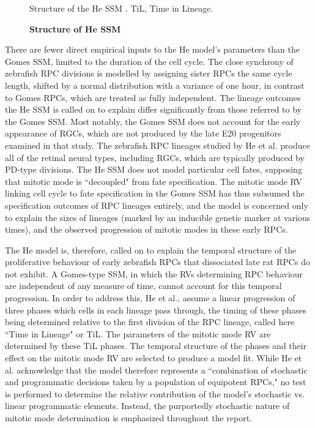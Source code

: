 \begin{figure}[!h]
\caption{{\bf Structure of He SSM}}
Structure of the He SSM \cite{He2012}. TiL, Time in Lineage.
\label{HeSSM}
\end{figure}

There are fewer direct empirical inputs to the He model's parameters than the Gomes SSM, limited to the duration of the cell cycle. The close synchrony of zebrafish RPC divisions is modelled by assigning sister RPCs the same cycle length, shifted by a normal distribution with a variance of one hour, in contrast to Gomes RPCs, which are treated as fully independent. The lineage outcomes the He SSM is called on to explain differ significantly from those referred to by the Gomes SSM. Most notably, the Gomes SSM does not account for the early appearance of RGCs, which are not produced by the late E20 progenitors examined in that study. The zebrafish RPC lineages studied by He et al. produce all of the retinal neural types, including RGCs, which are typically produced by PD-type divisions. The He SSM does not model particular cell fates, supposing that mitotic mode is ``decoupled" from fate specification. The mitotic mode RV linking cell cycle to fate specification in the Gomes SSM has thus subsumed the specification outcomes of RPC lineages entirely, and the model is concerned only to explain the sizes of lineages (marked by an inducible genetic marker at various times), and the observed progression of mitotic modes in these early RPCs.

The He model is, therefore, called on to explain the temporal structure of the proliferative behaviour of early zebrafish RPCs that dissociated late rat RPCs do not exhibit. A Gomes-type SSM, in which the RVs determining RPC behaviour are independent of any measure of time, cannot account for this temporal progression. In order to address this, He et al., assume a linear progression of three phases which cells in each lineage pass through, the timing of these phases being determined relative to the first division of the RPC lineage, called here ``Time in Lineage" or TiL. The parameters of the mitotic mode RV are determined by these TiL phases. The temporal structure of the phases and their effect on the mitotic mode RV are selected to produce a model fit. While He et al. acknowledge that the model therefore represents a ``combination of stochastic and programmatic decisions taken by a population of equipotent RPCs," no test is performed to determine the relative contribution of the model's stochastic vs. linear programmatic elements. Instead, the purportedly stochastic nature of mitotic mode determination is emphasized throughout the report.

